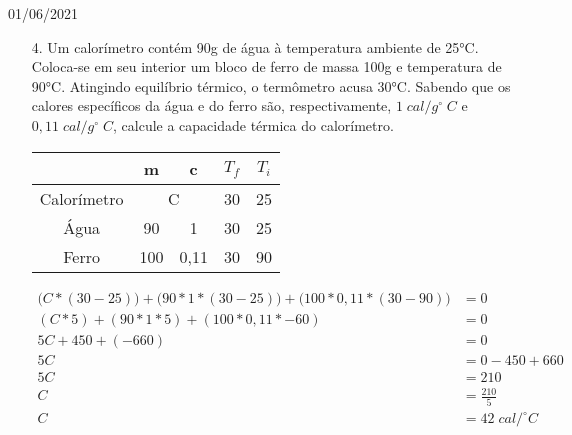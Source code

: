 \documentclass{SchoolBook}
\begin{document}
\begin{day}{01/06/2021}
\begin{enumerate}
            \item[4.] Um calorímetro contém 90g de água à temperatura ambiente de 25°C. Coloca-se em seu interior um bloco de ferro de massa 100g e temperatura de 90°C. Atingindo equilíbrio térmico, o termômetro acusa 30°C. Sabendo que os calores específicos da água e do ferro são, respectivamente, $1\;cal/g^\circ\;C$ e $0,11\;cal/g^\circ\;C$, calcule a capacidade térmica do calorímetro.
            \begin{center}
                \vspace{6pt}
                \begin{tabular}{|c|c|c|c|c|}\hline
                                & m   & c    & $T_f$ & $T_i$ \\\hline
                    Calorímetro & \multicolumn{2}{|c|}{C} & 30  & 25    \\\hline
                    Água        & 90  & 1    & 30    & 25    \\\hline
                    Ferro       & 100 & 0,11 & 30    & 90    \\\hline
                \end{tabular}
            \end{center}
            \begin{align*}
                \Big(C          * (30 - 25)\Big) +
                \Big(90  * 1    * (30 - 25)\Big) +
                \Big(100 * 0,11 * (30 - 90)\Big) &= 0 \\
                    (C          *   5          ) +
                    (90  * 1    *   5          ) +
                    (100 * 0,11 *  -60         ) &= 0 \\
                     5C  + 450  + (-660)         &= 0 \\
                     5C                          &= 0 - 450 + 660 \\
                     5C                          &= 210 \\
                      C                          &= \frac{210}{5} \\
                      C                          &= 42\;cal/^\circ C
            \end{align*}
        \end{enumerate}
    \end{day}
    
\end{document}
